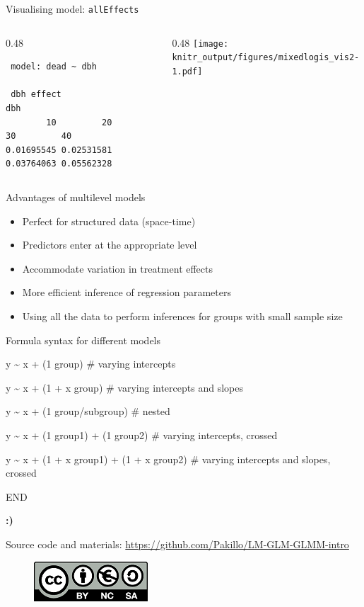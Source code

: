 \documentclass[10pt,ignorenonframetext,]{beamer}
\providecommand{\tightlist}{%
\setlength{\itemsep}{0pt}\setlength{\parskip}{0pt}}
\def\begincols{\begin{columns}[c]}
\def\endcols{\end{columns}}
\def\begincol{\begin{column}{0.48\textwidth}}
\def\endcol{\end{column}}
\begin{document}
\begin{frame}[fragile]{Visualising model: \texttt{allEffects}}

\begincols
\begincol

\begin{verbatim}
 model: dead ~ dbh

 dbh effect
dbh
        10         20         30         40 
0.01695545 0.02531581 0.03764063 0.05562328 
\end{verbatim}

\endcol

\begincol
\texttt{[image: knitr\_output/figures/mixedlogis\_vis2-1.pdf]} \endcol
\endcols

\end{frame}

\begin{frame}{Advantages of multilevel models}

\begin{itemize}[<+->]
\tightlist
\item
  Perfect for structured data (space-time)
\item
  Predictors enter at the appropriate level
\item
  Accommodate variation in treatment effects
\item
  More efficient inference of regression parameters
\item
  Using all the data to perform inferences for groups with small sample
  size
\end{itemize}

\end{frame}

\begin{frame}{Formula syntax for different models}

y \textasciitilde{} x + (1 \textbar{} group) \# varying intercepts

y \textasciitilde{} x + (1 + x \textbar{} group) \# varying intercepts
and slopes

y \textasciitilde{} x + (1 \textbar{} group/subgroup) \# nested

y \textasciitilde{} x + (1 \textbar{} group1) + (1 \textbar{} group2) \#
varying intercepts, crossed

y \textasciitilde{} x + (1 + x \textbar{} group1) + (1 + x \textbar{}
group2) \# varying intercepts and slopes, crossed

\end{frame}

\begin{frame}{END}

\textbf{:)}

Source code and materials:
\url{https://github.com/Pakillo/LM-GLM-GLMM-intro}

\begin{figure}[htbp]
\centering
\includegraphics{images/CClogo.png}
\caption{}
\end{figure}

\end{frame}
\end{document}
